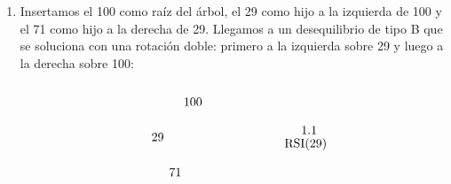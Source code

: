 \documentclass[10pt,a4paper,spanish]{report}
\begin{document}
\begin{enumerate}
      \item Insertamos el 100 como raíz del árbol, el 29 como hijo a la izquierda de 100 y el 71 como hijo a la derecha de 29. Llegamos a un desequilibrio de tipo B que se soluciona con una rotación doble: primero a la izquierda sobre 29 y luego a la derecha sobre 100:


      \begin{minipage}{0.4\textwidth}
      \[\begin{xy}
      ,(33,-8)*+=<10mm>[]\txt<2cm>{1.1}
      ,(32,-12)*+=<20mm>[]\txt<2cm>{RSI(29)}
      ,(0,0)*+=<10mm>[]\txt<2cm>{100}
      ,(-10,-10)*+=<10mm>[]\txt<2cm>{29}
      ,(-5,-20)*+=<10mm>[]\txt<2cm>{71}


\end{xy}\]
\end{minipage}
\end{enumerate}
\end{document}
